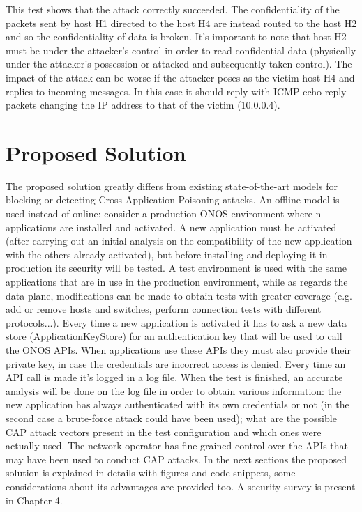 \documentclass[a4paper,10pt]{memoir}
\begin{document}
This test shows that the attack correctly succeeded. The confidentiality of the packets sent by host H1 directed to the host H4 are instead routed to the host H2 and so the confidentiality of data is broken. It's important to note that host H2 must be under the attacker's control in order to read confidential data (physically under the attacker's possession or attacked and subsequently taken control). The impact of the attack can be worse if the attacker poses as the victim host H4 and replies to incoming messages. In this case it should reply with ICMP echo reply packets changing the IP address to that of the victim (10.0.0.4).


\clearpage

\chapter{Proposed Solution}

The proposed solution greatly differs from existing state-of-the-art models for blocking or detecting Cross Application Poisoning attacks. An offline model is used instead of online: consider a production ONOS environment where n applications are installed and activated. A new application must be activated (after carrying out an initial analysis on the compatibility of the new application with the others already activated), but before installing and deploying it in production its security will be tested. A test environment is used with the same applications that are in use in the production environment, while as regards the data-plane, modifications can be made to obtain tests with greater coverage (e.g. add or remove hosts and switches, perform connection tests with different protocols...). Every time a new application is activated it has to ask a new data store (ApplicationKeyStore) for an authentication key that will be used to call the ONOS APIs. When applications use these APIs they must also provide their private key, in case the credentials are incorrect access is denied. Every time an API call is made it's logged in a log file. When the test is finished, an accurate analysis will be done on the log file in order to obtain various information: the new application has always authenticated with its own credentials or not (in the second case a brute-force attack could have been used); what are the possible CAP attack vectors present in the test configuration and which ones were actually used. The network operator has fine-grained control over the APIs that may have been used to conduct CAP attacks. In the next sections the proposed solution is explained in details with figures and code snippets, some considerations about its advantages are provided too. A security survey is present in Chapter 4.
\end{document}
